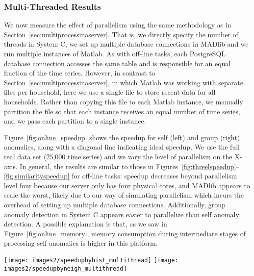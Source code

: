\documentclass[prodmode,acmtods]{acmsmall}
\begin{document}
\subsubsection{Multi-Threaded Results}

We now measure the effect of parallelism using the same methodology as in Section~\ref{sec:multiprocessinaserver}.  That is, we directly specify the number of threads in System C, we set up multiple database connections in MADlib and we run multiple instances of Matlab.  As with off-line tasks, each PostgreSQL database connection accesses the same table and is responsible for an equal fraction of the time series.  However, in contrast to Section~\ref{sec:multiprocessinaserver}, in which Matlab was working with separate files per household, here we use a single file to store recent data for all households.  Rather than copying this file to each Matlab instance, we manually partition the file so that each instance receives an equal number of time series, and we pass each partition to a single instance.

Figure~\ref{fig:online_speedup} shows the speedup for self (left) and group (right) anomalies, along with a diagonal line indicating ideal speedup.  We use the full real data set (25,000 time series) and we vary the level of parallelism on the X-axis.  In general, the results are similar to those in Figures~\ref{fig:threelspeedup}--\ref{fig:similarityspeedup} for off-line tasks: speedup decreases beyond parallelism level four because our server only has four physical cores, and MADlib appears to scale the worst, likely due to our way of simulating parallelism which incurs the overhead of setting up multiple database connections.  Additionally, group anomaly detection in System C appears easier to parallelize than self anomaly detection.  A possible explanation is that, as we saw in Figure~\ref{fig:online_memory}, memory consumption during intermediate stages of processing self anomalies is higher in this platform.  

\begin{figure*}[t]
\centering
\texttt{[image: images2/speedupbyhist\_multithread]}
\texttt{[image: images2/speedupbyneigh\_multithread]}
\caption{Speedup of execution time on a single multi-core server using the real data set for self (left) and group (right) anomalies.}
\label{fig:online_speedup}
\end{figure*}
\end{document}

